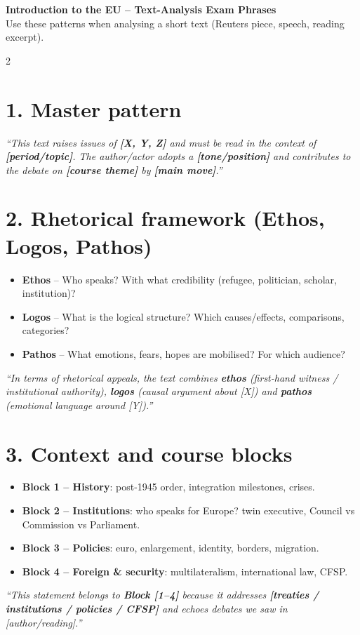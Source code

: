 \documentclass[10pt,a4paper]{article}
\begin{document}
\small
\begin{center}
{\large\bfseries\color{eublue} Introduction to the EU -- Text-Analysis Exam Phrases}\\[0.2em]
\footnotesize Use these patterns when analysing a short text (Reuters piece, speech, reading excerpt).
\end{center}
\vspace{0.3em}

\begin{multicols}{2}

\section*{\color{eublue}1. Master pattern}
\emph{``This text raises issues of \textbf{[X, Y, Z]} and must be read in the context of \textbf{[period/topic]}. The author/actor adopts a \textbf{[tone/position]} and contributes to the debate on \textbf{[course theme]} by \textbf{[main move]}.''}

\section*{\color{eublue}2. Rhetorical framework (Ethos, Logos, Pathos)}
\begin{itemize}
\item \textbf{Ethos} – Who speaks? With what credibility (refugee, politician, scholar, institution)?
\item \textbf{Logos} – What is the logical structure? Which causes/effects, comparisons, categories?
\item \textbf{Pathos} – What emotions, fears, hopes are mobilised? For which audience?
\end{itemize}
\emph{``In terms of rhetorical appeals, the text combines \textbf{ethos} (first-hand witness / institutional authority), \textbf{logos} (causal argument about [X]) and \textbf{pathos} (emotional language around [Y]).''}

\section*{\color{eublue}3. Context and course blocks}
\begin{itemize}
\item \textbf{Block 1 – History}: post-1945 order, integration milestones, crises.
\item \textbf{Block 2 – Institutions}: who speaks for Europe? twin executive, Council vs Commission vs Parliament.
\item \textbf{Block 3 – Policies}: euro, enlargement, identity, borders, migration.
\item \textbf{Block 4 – Foreign \& security}: multilateralism, international law, CFSP.
\end{itemize}
\emph{``This statement belongs to \textbf{Block [1–4]} because it addresses \textbf{[treaties / institutions / policies / CFSP]} and echoes debates we saw in [author/reading].''}


\end{multicols}
\end{document}
